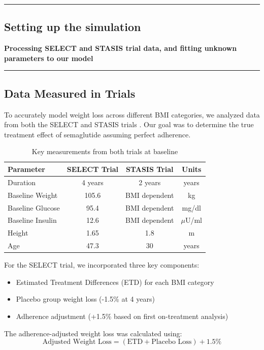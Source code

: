 {\color{gray}\hrule}
\begin{center}
\section{Setting up the simulation}
\textbf{Processing SELECT and STASIS trial data, and fitting unknown parameters to our model}
\bigskip
\end{center}
{\color{gray}\hrule}

\subsection{Data Measured in Trials}
To accurately model weight loss across different BMI categories, we analyzed data from both the SELECT and STASIS trials \cite{Ryan2024}. Our goal was to determine the true treatment effect of semaglutide assuming perfect adherence.

\begin{table}[h]
\centering
\begin{tabular}{|l|c|c|c|}
\hline
\textbf{Parameter} & \textbf{SELECT Trial} & \textbf{STASIS Trial} & \textbf{Units} \\
\hline
Duration & 4 years & 2 years & years \\
Baseline Weight & 105.6 & BMI dependent & kg \\
Baseline Glucose & 95.4 & BMI dependent & mg/dl \\
Baseline Insulin & 12.6 & BMI dependent & $\mu$U/ml \\
Height & 1.65 & 1.8 & m \\
Age & 47.3 & 30 & years \\
\hline
\end{tabular}
\caption{Key measurements from both trials at baseline}
\end{table}

For the SELECT trial, we incorporated three key components:
\begin{itemize}
    \item Estimated Treatment Differences (ETD) for each BMI category
    \item Placebo group weight loss (-1.5\% at 4 years)
    \item Adherence adjustment (+1.5\% based on first on-treatment analysis)
\end{itemize}

The adherence-adjusted weight loss was calculated using:
\begin{equation}
    \text{Adjusted Weight Loss} = (\text{ETD} + \text{Placebo Loss}) + 1.5\%
\end{equation}

